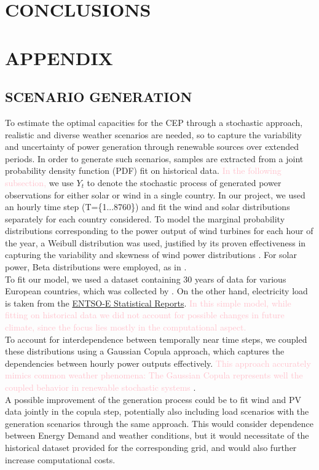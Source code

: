 {\section{CONCLUSIONS}





\color{black}

\section{APPENDIX}
\subsection{SCENARIO GENERATION}

To estimate the optimal capacities for the CEP through a stochastic approach, realistic and diverse weather scenarios are needed, so to capture the variability and uncertainty of power generation through renewable sources over extended periods. 
In order to generate such scenarios, samples are extracted from a joint probability density function (PDF) fit on historical data. \textcolor{pink}{In the following subsection,} we use \(Y_t\) to denote the stochastic process of generated power observations for either solar or wind in a single country.
In our project, we used an hourly time step (T=\{1...8760\}) and fit the wind and solar distributions separately for each country considered.
To model the marginal probability distributions corresponding to the power output of wind turbines for each hour of the year, a Weibull distribution was used, justified by its proven effectiveness in capturing the variability and skewness of wind power distributions \textcolor{green}{\cite{weibullwind}}. 
For solar power, Beta distributions were employed, as in \textcolor{green}{\cite{betaPV}}. \\
\indent  To fit our model, we used a dataset containing 30 years of data for various European countries, which was collected by \textcolor{green}{\cite{30y_gen}}. 
On the other hand, electricity load is taken from the \textcolor{green}{\href{https://www.entsoe.eu/data/power-stats/}{ENTSO-E Statistical Reports}}. 
\textcolor{pink}{In this simple model, while fitting on historical data we did not account for possible changes in future climate, since the focus lies mostly in the computational aspect.}\\
To account for interdependence between temporally near time steps, we coupled these distributions using a Gaussian Copula approach, which captures the dependencies between hourly power outputs effectively. \textcolor{pink}{This approach accurately mimics common weather phenomena: The Gaussian Copula represents well the coupled behavior in renewable stochastic systems} \textcolor{green}{\cite{GaussCopula}}. \\
\indent A possible improvement of the generation process could be to fit wind and PV data jointly in the copula step, potentially also including load scenarios with the generation scenarios through the same approach. This would consider dependence between Energy Demand and weather conditions, but it would necessitate of the historical dataset provided for the corresponding grid, and would also further increase computational costs.


}
